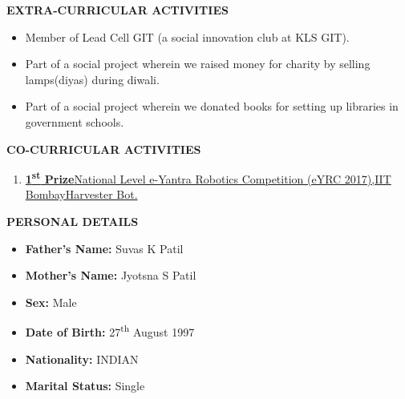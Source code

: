 \documentclass[a4paper]{article}
\begin{document}
	\begin{flushleft}
		\vspace{5mm}
		\large{\textbf{EXTRA-CURRICULAR ACTIVITIES }} 
		\vspace{0.5mm}
		\noindent\hrulefill
		\vspace{0.5mm}
	\end{flushleft}
	\begin{itemize}
		\item Member of Lead Cell GIT (a social innovation club at KLS GIT). 
		\item Part of a social project wherein we raised money for charity by selling lamps(diyas) during diwali. 
		\item Part of a social project wherein we donated books for setting up libraries in government schools.           
	\end{itemize}

	\begin{flushleft}
		\vspace{5mm}
		\large{\textbf{CO-CURRICULAR ACTIVITIES}} 
		\vspace{0.5mm}
		\noindent\hrulefill
		\vspace{0.5mm}
	\end{flushleft}
	\begin{enumerate}
		\item \href{http://eycgen.e-yantra.org/index.php/validate/1c554533d0991a7d96b51b2238d1d3df75ebc0b0}{\textbf{1\textsuperscript{st} Prize}\textbar National Level e-Yantra Robotics Competition (eYRC 2017),IIT Bombay\textbar Harvester Bot.}       
	\end{enumerate}

	\begin{flushleft}
		\vspace{5mm}
		\large{\textbf{PERSONAL DETAILS }} 
		\vspace{0.5mm}
		\noindent\hrulefill
		\vspace{0.5mm}
	\end{flushleft}
	\begin{itemize}
		\item \textbf{Father's Name:} Suvas K Patil
		\item \textbf{Mother's Name:} Jyotsna S Patil
		\item \textbf{Sex:} Male
		\item \textbf{Date of Birth:} 27\textsuperscript{th} August 1997
		\item \textbf{Nationality:} INDIAN
		\item \textbf{Marital Status:} Single 				          
	\end{itemize}
\end{document}
